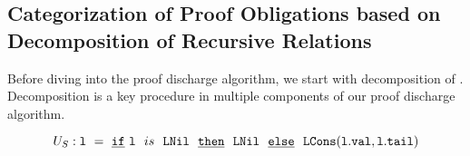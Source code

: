 %


\subsection[Categorization of Proof Obligations]{Categorization of Proof Obligations based on Decomposition of Recursive Relations}
\label{sec:syn-cat-decomp}
Before diving into the proof discharge algorithm, we start with decomposition of \recursiveRelations{}.
Decomposition is a key procedure in multiple components of our proof discharge algorithm.

\begin{small}
\begin{equation}\label{eqn:specDeconstruct}
U_S: {\tt l\ =\ \underline{if}\ l}\ \ is\ \ {\tt LNil\ \ \underline{then}\ \ LNil\ \ \underline{else}\ \ LCons(l.val,l.tail)}
\end{equation}
\end{small}

